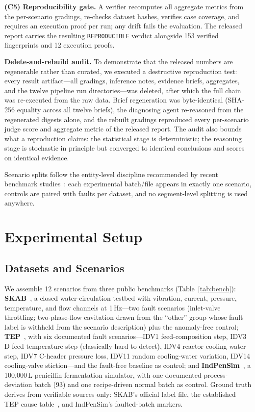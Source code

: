 \documentclass[journal]{IEEEtran}
\begin{document}
\textbf{(C5) Reproducibility gate.} A verifier recomputes all aggregate metrics from the per-scenario gradings, re-checks dataset hashes, verifies case coverage, and requires an execution proof per run; any drift fails the evaluation. The released report carries the resulting \texttt{REPRODUCIBLE} verdict alongside 153 verified fingerprints and 12 execution proofs.

\textbf{Delete-and-rebuild audit.} To demonstrate that the released numbers are regenerable rather than curated, we executed a destructive reproduction test: every result artifact---all gradings, inference notes, evidence briefs, aggregates, and the twelve pipeline run directories---was deleted, after which the full chain was re-executed from the raw data. Brief regeneration was byte-identical (SHA-256 equality across all twelve briefs), the diagnosing agent re-reasoned from the regenerated digests alone, and the rebuilt gradings reproduced every per-scenario judge score and aggregate metric of the released report. The audit also bounds what a reproduction claims: the statistical stage is deterministic; the reasoning stage is stochastic in principle but converged to identical conclusions and scores on identical evidence.

Scenario splits follow the entity-level discipline recommended by recent benchmark studies~\cite{vieira2026towards,hendriks2022towards}: each experimental batch/file appears in exactly one scenario, controls are paired with faults per dataset, and no segment-level splitting is used anywhere.

\section{Experimental Setup}
\label{sec:setup}

\subsection{Datasets and Scenarios}
We assemble 12 scenarios from three public benchmarks (Table~\ref{tab:bench}): \textbf{SKAB}~\cite{skab2020}, a closed water-circulation testbed with vibration, current, pressure, temperature, and flow channels at 1\,Hz---two fault scenarios (inlet-valve throttling; two-phase-flow cavitation drawn from the ``other'' group whose fault label is withheld from the scenario description) plus the anomaly-free control; \textbf{TEP}~\cite{downs1993plant,rieth2023additional}, with six documented fault scenarios---IDV1 feed-composition step, IDV3 D-feed-temperature step (classically hard to detect), IDV4 reactor-cooling-water step, IDV7 C-header pressure loss, IDV11 random cooling-water variation, IDV14 cooling-valve stiction---and the fault-free baseline as control; and \textbf{IndPenSim}~\cite{indpensim2020}, a 100{,}000\,L penicillin fermentation simulator, with one documented process-deviation batch (93) and one recipe-driven normal batch as control. Ground truth derives from verifiable sources only: SKAB's official label file, the established TEP cause table~\cite{chiang2001fault}, and IndPenSim's faulted-batch markers.
\end{document}
